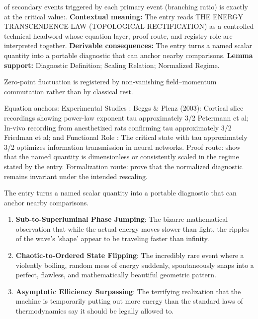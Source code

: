 of secondary events triggered by each primary event (branching ratio) is exactly at the critical value:. \textbf{Contextual meaning:} The entry reads THE ENERGY TRANSCENDENCE LAW (TOPOLOGICAL RECTIFICATION) as a controlled technical headword whose equation layer, proof route, and registry role are interpreted together. \textbf{Derivable consequences:} The entry turns a named scalar quantity into a portable diagnostic that can anchor nearby comparisons. \textbf{Lemma support:} Diagnostic Definition; Scaling Relation; Normalized Regime.\par
\endgroup

Zero-point fluctuation is registered by non-vanishing field--momentum commutation rather than by classical rest.

Equation anchors: Experimental Studies : Beggs \& Plenz (2003): Cortical slice recordings showing power-law exponent tau approximately 3/2 Petermann et al; In-vivo recording from anesthetized rats confirming tau approximately 3/2 Friedman et al; and Functional Role : The critical state with tau approximately 3/2 optimizes information transmission in neural networks. Proof route: show that the named quantity is dimensionless or consistently scaled in the regime stated by the entry. Formalization route: prove that the normalized diagnostic remains invariant under the intended rescaling.

The entry turns a named scalar quantity into a portable diagnostic that can anchor nearby comparisons.
\endgroup

\begin{enumerate}[leftmargin=1.6em,itemsep=6pt,topsep=4pt]
\item \textbf{Sub-to-Superluminal Phase Jumping}: The bizarre mathematical observation that while the actual energy moves slower than light, the ripples of the wave's 'shape' appear to be traveling faster than infinity.
\item \textbf{Chaotic-to-Ordered State Flipping}: The incredibly rare event where a violently boiling, random mess of energy suddenly, spontaneously snaps into a perfect, flawless, and mathematically beautiful geometric pattern.
\item \textbf{Asymptotic Efficiency Surpassing}: The terrifying realization that the machine is temporarily putting out more energy than the standard laws of thermodynamics say it should be legally allowed to.
\end{enumerate}

